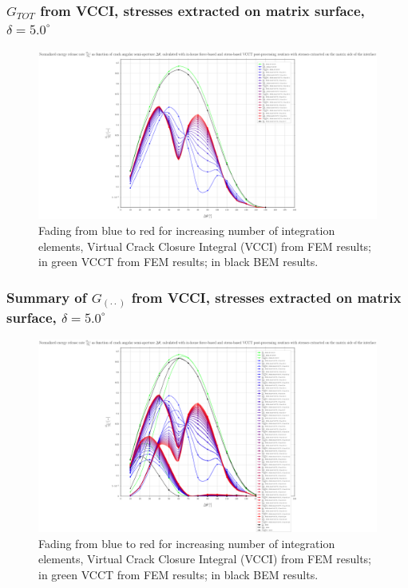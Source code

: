 \begin{frame}
\frametitle{\small $G_{TOT}$ from VCCI, stresses extracted on matrix surface, $\delta=5.0^{\circ}$}
\vspace{-0.5cm}
\centering
\captionsetup[figure]{font=scriptsize,labelfont=scriptsize}
\begin{figure}[!h]
\centering
\includegraphics[height=0.7\textheight]{2017-07-25_AbqRunSummary_SmallStrain_D05/pdf/2017-07-25_AbqRunSummary_SmallStrain_D05_F-SoM-VCCT_GTOT.pdf}
  \caption{\scriptsize Fading from blue to red for increasing number of integration elements, Virtual Crack Closure Integral (VCCI) from FEM results; in green VCCT from FEM results; in black BEM results.}
  \label{fig:res1}
\end{figure}
\end{frame}
\begin{frame}
\frametitle{\small Summary of $G_{\left(\cdot\cdot\right)}$ from VCCI, stresses extracted on matrix surface, $\delta=5.0^{\circ}$}
\vspace{-0.5cm}
\centering
\captionsetup[figure]{font=scriptsize,labelfont=scriptsize}
\begin{figure}[!h]
\centering
\includegraphics[height=0.7\textheight]{2017-07-25_AbqRunSummary_SmallStrain_D05/pdf/2017-07-25_AbqRunSummary_SmallStrain_D05_F-SoM-VCCT_Summary.pdf}
  \caption{\scriptsize Fading from blue to red for increasing number of integration elements, Virtual Crack Closure Integral (VCCI) from FEM results; in green VCCT from FEM results; in black BEM results.}
  \label{fig:res1}
\end{figure}
\end{frame}
